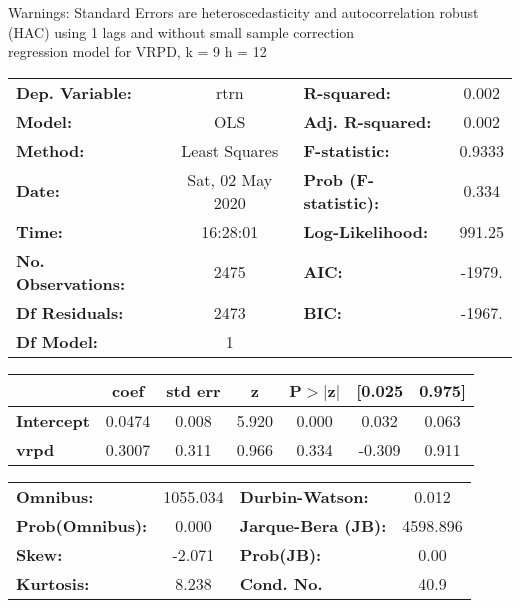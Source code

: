 Warnings: \newline
 [1] Standard Errors are heteroscedasticity and autocorrelation robust (HAC) using 1 lags and without small sample correction\\ 

regression model for VRPD, k = 9 h = 12\begin{center}
\begin{tabular}{lclc}
\toprule
\textbf{Dep. Variable:}    &       rtrn       & \textbf{  R-squared:         } &     0.002   \\
\textbf{Model:}            &       OLS        & \textbf{  Adj. R-squared:    } &     0.002   \\
\textbf{Method:}           &  Least Squares   & \textbf{  F-statistic:       } &    0.9333   \\
\textbf{Date:}             & Sat, 02 May 2020 & \textbf{  Prob (F-statistic):} &    0.334    \\
\textbf{Time:}             &     16:28:01     & \textbf{  Log-Likelihood:    } &    991.25   \\
\textbf{No. Observations:} &        2475      & \textbf{  AIC:               } &    -1979.   \\
\textbf{Df Residuals:}     &        2473      & \textbf{  BIC:               } &    -1967.   \\
\textbf{Df Model:}         &           1      & \textbf{                     } &             \\
\bottomrule
\end{tabular}
\begin{tabular}{lcccccc}
                   & \textbf{coef} & \textbf{std err} & \textbf{z} & \textbf{P$> |$z$|$} & \textbf{[0.025} & \textbf{0.975]}  \\
\midrule
\textbf{Intercept} &       0.0474  &        0.008     &     5.920  &         0.000        &        0.032    &        0.063     \\
\textbf{vrpd}      &       0.3007  &        0.311     &     0.966  &         0.334        &       -0.309    &        0.911     \\
\bottomrule
\end{tabular}
\begin{tabular}{lclc}
\textbf{Omnibus:}       & 1055.034 & \textbf{  Durbin-Watson:     } &    0.012  \\
\textbf{Prob(Omnibus):} &   0.000  & \textbf{  Jarque-Bera (JB):  } & 4598.896  \\
\textbf{Skew:}          &  -2.071  & \textbf{  Prob(JB):          } &     0.00  \\
\textbf{Kurtosis:}      &   8.238  & \textbf{  Cond. No.          } &     40.9  \\
\bottomrule
\end{tabular}
\end{center}

